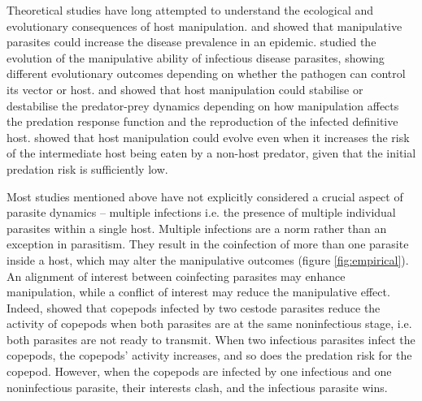 \documentclass[a4paper]{scrartcl}
\begin{document}
Theoretical studies have long attempted to understand the ecological and evolutionary consequences of host manipulation. 
\cite{Roosien2013} and \cite{Hosack2008} showed that manipulative parasites could increase the disease prevalence in an epidemic. \cite{Gandon2018} studied the evolution of the manipulative ability of infectious disease parasites, showing different evolutionary outcomes depending on whether the pathogen can control its vector or host.
\cite{Hadeler1989, Fenton2006} and \cite{Rogawa2018} showed that host manipulation could stabilise or destabilise the predator-prey dynamics depending on how manipulation affects the predation response function and the reproduction of the infected definitive host. 
\cite{Seppl2008} showed that host manipulation could evolve even when it increases the risk of the intermediate host being eaten by a non-host predator, given that the initial predation risk is sufficiently low.  

Most studies mentioned above have not explicitly considered a crucial aspect of parasite dynamics -- multiple infections \citep{kalbe:JFB:2002} i.e. the presence of multiple individual parasites within a single host.
Multiple infections are a norm rather than an exception in parasitism. 
They result in the coinfection of more than one parasite inside a host, which may alter the manipulative outcomes (figure \ref{fig:empirical}). 
An alignment of interest between coinfecting parasites may enhance manipulation, while a conflict of interest may reduce the manipulative effect. 
Indeed, \cite{Hafer:2015gl} showed that copepods infected by two cestode parasites reduce the activity of copepods when both parasites are at the same noninfectious stage, i.e. both parasites are not ready to transmit. 
When two infectious parasites infect the copepods, the copepods' activity increases, and so does the predation risk for the copepod. 
However, when the copepods are infected by one infectious and one noninfectious parasite, their interests clash, and the infectious parasite wins. 
\end{document}
